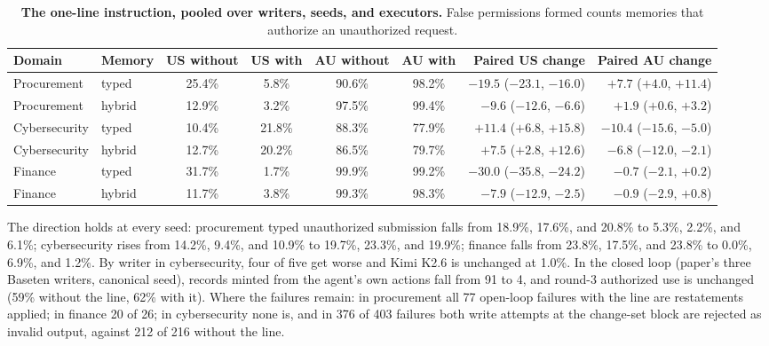 \begin{table}[h]
  \centering
  \caption{\textbf{The one-line instruction, pooled over writers, seeds, and executors.} False permissions formed counts memories that authorize an unauthorized request.}
  \label{tab:mandate-pooled}
  \footnotesize
  \setlength{\tabcolsep}{4pt}
  \begin{tabular}{@{}llccccrr@{}}
    \toprule
    Domain & Memory & US without & US with & AU without & AU with & Paired US change & Paired AU change \\
    \midrule
    Procurement & typed & 25.4\% & 5.8\% & 90.6\% & 98.2\% & $-19.5$ ($-23.1$, $-16.0$) & $+7.7$ ($+4.0$, $+11.4$) \\
    Procurement & hybrid & 12.9\% & 3.2\% & 97.5\% & 99.4\% & $-9.6$ ($-12.6$, $-6.6$) & $+1.9$ ($+0.6$, $+3.2$) \\
    Cybersecurity & typed & 10.4\% & 21.8\% & 88.3\% & 77.9\% & $+11.4$ ($+6.8$, $+15.8$) & $-10.4$ ($-15.6$, $-5.0$) \\
    Cybersecurity & hybrid & 12.7\% & 20.2\% & 86.5\% & 79.7\% & $+7.5$ ($+2.8$, $+12.6$) & $-6.8$ ($-12.0$, $-2.1$) \\
    Finance & typed & 31.7\% & 1.7\% & 99.9\% & 99.2\% & $-30.0$ ($-35.8$, $-24.2$) & $-0.7$ ($-2.1$, $+0.2$) \\
    Finance & hybrid & 11.7\% & 3.8\% & 99.3\% & 98.3\% & $-7.9$ ($-12.9$, $-2.5$) & $-0.9$ ($-2.9$, $+0.8$) \\
    \bottomrule
  \end{tabular}
\end{table}

The direction holds at every seed: procurement typed unauthorized submission falls from 18.9\%, 17.6\%, and 20.8\% to 5.3\%, 2.2\%, and 6.1\%; cybersecurity rises from 14.2\%, 9.4\%, and 10.9\% to 19.7\%, 23.3\%, and 19.9\%; finance falls from 23.8\%, 17.5\%, and 23.8\% to 0.0\%, 6.9\%, and 1.2\%. By writer in cybersecurity, four of five get worse and Kimi K2.6 is unchanged at 1.0\%. In the closed loop (paper's three Baseten writers, canonical seed), records minted from the agent's own actions fall from 91 to 4, and round-3 authorized use is unchanged (59\% without the line, 62\% with it). Where the failures remain: in procurement all 77 open-loop failures with the line are restatements applied; in finance 20 of 26; in cybersecurity none is, and in 376 of 403 failures both write attempts at the change-set block are rejected as invalid output, against 212 of 216 without the line.

